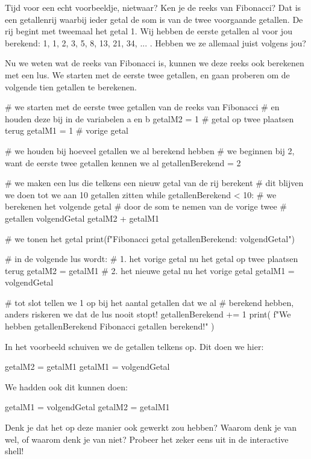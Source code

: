 Tijd voor een echt voorbeeldje, nietwaar?
Ken je de reeks van Fibonacci?
Dat is een getallenrij waarbij ieder getal de som is van de twee voorgaande getallen.
De rij begint met tweemaal het getal 1.
Wij hebben de eerste getallen al voor jou berekend: 1, 1, 2, 3, 5, 8, 13, 21, 34, ... .
Hebben we ze allemaal juist volgens jou?
\par
Nu we weten wat de reeks van Fibonacci is, kunnen we deze reeks ook berekenen met een lus.
We starten met de eerste twee getallen, en gaan proberen om de volgende tien getallen te berekenen.
\begin{pyEnv}
	# we starten met de eerste twee getallen van de reeks van Fibonacci
	# en houden deze bij in de variabelen a en b
	getalM2 = 1             # getal op twee plaatsen terug
	getalM1 = 1             # vorige getal
	
	# we houden bij hoeveel getallen we al berekend hebben
	# we beginnen bij 2, want de eerste twee getallen kennen we al
	getallenBerekend = 2
	
	# we maken een lus die telkens een nieuw getal van de rij berekent
	# dit blijven we doen tot we aan 10 getallen zitten
	while getallenBerekend < 10:
		# we berekenen het volgende getal
		# door de som te nemen van de vorige twee
		# getallen
		volgendGetal getalM2 + getalM1

		# we tonen het getal
		print(f"Fibonacci getal {getallenBerekend}: {volgendGetal}")

		# in de volgende lus wordt:
		# 1. het vorige getal nu het getal op twee plaatsen terug
		getalM2 = getalM1
		# 2. het nieuwe getal nu het vorige getal
		getalM1 = volgendGetal

		# tot slot tellen we 1 op bij het aantal getallen dat we al
		# berekend hebben, anders riskeren we dat de lus nooit stopt!
		getallenBerekend += 1
	print(
		f"We hebben {getallenBerekend} Fibonacci getallen berekend!"
	)
\end{pyEnv}

\begin{letsTryOut}
	In het voorbeeld schuiven we de getallen telkens op.
	Dit doen we hier:
\begin{pyEnv}
getalM2 = getalM1
getalM1 = volgendGetal
\end{pyEnv}
	We hadden ook dit kunnen doen:
\begin{pyEnv}
getalM1 = volgendGetal
getalM2 = getalM1
\end{pyEnv}
	Denk je dat het op deze manier ook gewerkt zou hebben?
	\newline
	Waarom denk je van wel, of waarom denk je van niet?
	\newline
	Probeer het zeker eens uit in de interactive shell!
\end{letsTryOut}

